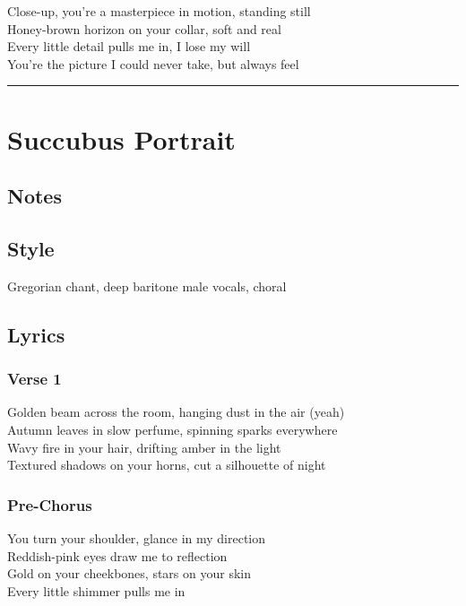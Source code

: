 Close-up, you're a masterpiece in motion, standing still\\
Honey-brown horizon on your collar, soft and real\\
Every little detail pulls me in, I lose my will\\
You're the picture I could never take, but always feel

\begin{center}\rule{0.5\linewidth}{0.5pt}\end{center}

\section{Succubus Portrait}\label{succubus-portrait}

\subsection{Notes}\label{notes-16}

\subsection{Style}\label{style-15}

Gregorian chant, deep baritone male vocals, choral

\subsection{Lyrics}\label{lyrics-15}

\subsubsection{Verse 1}\label{verse-1-8}

Golden beam across the room, hanging dust in the air (yeah)\\
Autumn leaves in slow perfume, spinning sparks everywhere\\
Wavy fire in your hair, drifting amber in the light\\
Textured shadows on your horns, cut a silhouette of night

\subsubsection{Pre-Chorus}\label{pre-chorus-8}

You turn your shoulder, glance in my direction\\
Reddish-pink eyes draw me to reflection\\
Gold on your cheekbones, stars on your skin\\
Every little shimmer pulls me in

